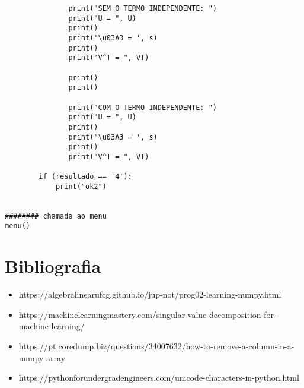 \documentclass[a4paper,12pt,twoside]{article}
\begin{document}
\begin{lstlisting}
               print("SEM O TERMO INDEPENDENTE: ")
               print("U = ", U)
               print()
               print('\u03A3 = ', s)
               print()
               print("V^T = ", VT)
                
               print()
               print()
                
               print("COM O TERMO INDEPENDENTE: ")
               print("U = ", U)
               print()
               print('\u03A3 = ', s)
               print()
               print("V^T = ", VT)
                
        if (resultado == '4'):
            print("ok2")
    
    
######## chamada ao menu
menu()
\end{lstlisting}



\section{Bibliografia}
\begin{itemize}
   \item https://algebralinearufcg.github.io/jup-not/prog02-learning-numpy.html
   \item https://machinelearningmastery.com/singular-value-decomposition-for-machine-learning/
   \item https://pt.coredump.biz/questions/34007632/how-to-remove-a-column-in-a-numpy-array
   \item https://pythonforundergradengineers.com/unicode-characters-in-python.html
 \end{itemize}
\end{document}
